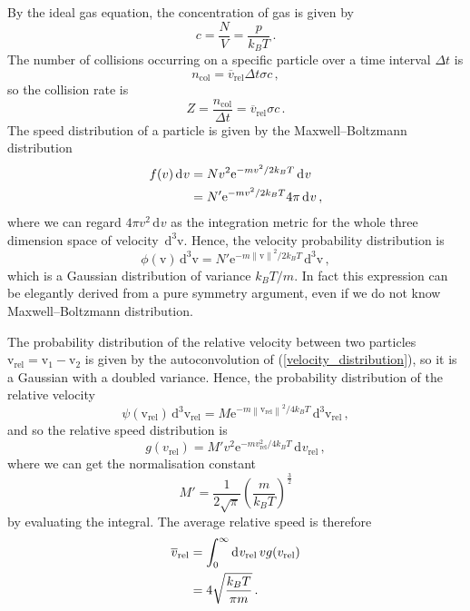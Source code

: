 \documentclass{article}
\theoremstyle{plain}\theoremheaderfont{\normalfont\itshape}\theorembodyfont{\rmfamily}\theoremseparator{.}\newtheorem*{rem}{Remark}\newtheorem*{ex}{Example}\newtheorem*{proof}{Proof}\newtheorem*{altp}{Alternative proof}
\theoremstyle{plain}\theoremheaderfont{\normalfont\bfseries}\theorembodyfont{\rmfamily}\theoremseparator{.}\newtheorem{thm}{Theorem}[section]\newtheorem{lem}[thm]{Lemma}\newtheorem{prop}[thm]{Proposition}\newtheorem*{cor}{Corollary}\newtheorem{defn}[thm]{Definition}\newtheorem{clm}[thm]{Claim}\newtheorem{clminproof}{Claim}\newtheorem{pos}{Postulate}[section]
\theoremstyle{break}\theoremheaderfont{\normalfont\itshape}\theorembodyfont{\rmfamily}\theoremseparator{.\medskip}\newtheorem*{proofskip}{Proof}\newtheorem*{exs}{Examples}\newtheorem*{rems}{Remarks}
\theoremstyle{break}\theoremheaderfont{\normalfont\bfseries}\theorembodyfont{\rmfamily}\theoremseparator{.\medskip}\newtheorem{lemskip}[thm]{Lemma}\newtheorem{defnskip}[thm]{Definition}\newtheorem{propskip}[thm]{Proposition}\newtheorem{thmskip}[thm]{Theorem}
\numberwithin{equation}{section}
\newcommand{\ee}{\mathrm{e}}
\newcommand{\dd}[2][]{\mathrm{d}^{#1} #2\,}
\renewcommand{\d}[2][]{\,\mathrm{d}^{#1} #2}
\newcommand{\vb}[1]{\bm{\mathrm{#1}}}
\newcommand{\norm}[1]{\left\| #1 \right\|}
\begin{document}
    By the ideal gas equation, the concentration of gas is given by
    \begin{equation}\label{ideal_gas_concentration}
        c=\frac{N}{V}=\frac{p}{k_BT}\,.
    \end{equation}
    The number of collisions occurring on a specific particle over a time interval \(\Delta t\) is
    \begin{equation}
        n_{\text{col}}=\overline{v}_{\text{rel}}\Delta t\sigma c\,,
    \end{equation}
    so the collision rate is
    \begin{equation}\label{collision_rate}
        Z=\frac{n_{\text{col}}}{\Delta t}=\overline{v}_{\text{rel}}\sigma c\,.
    \end{equation}
    The speed distribution of a particle is given by the Maxwell--Boltzmann distribution
    \begin{align}
        f(v)\d{v}&=Nv^2 \ee^{-mv^2/2k_BT}\d{v}\notag\\
        &=N'\ee^{-mv^2/2k_BT}4\pi\d{v}\,,
    \end{align}
    where we can regard \(4\pi v^2\d{v}\) as the integration metric for the whole three dimension space of velocity \(\d[3]{\vb{v}}\). Hence, the velocity probability distribution is
    \begin{equation}\label{velocity_distribution}
        \phi(\vb{v})\d[3]{\vb{v}}=N'\ee^{-m\norm{\vb{v}}^2/2k_B T}\d[3]{\vb{v}}\,,
    \end{equation}
    which is a Gaussian distribution of variance \(k_B T/m\). In fact this expression can be elegantly derived from a pure symmetry argument, even if we do not know Maxwell--Boltzmann distribution.

    The probability distribution of the relative velocity between two particles \(\vb{v}_{\text{rel}}=\vb{v}_1-\vb{v}_2\) is given by the autoconvolution of (\ref{velocity_distribution}), so it is a Gaussian with a doubled variance. Hence, the probability distribution of the relative velocity
    \begin{equation}
        \psi(\vb{v}_{\text{rel}})\d[3]{\vb{v}_{\text{rel}}}=M\ee^{-m\norm{\vb{v}_{\text{rel}}}^2/4k_B T}\d[3]{\vb{v}_{\text{rel}}}\,,
    \end{equation}
    and so the relative speed distribution is
    \begin{equation}
        g(v_{\text{rel}})=M'v^2\ee^{-mv_{\text{rel}}^2/4k_B T}\d{v_{\text{rel}}}\,,
    \end{equation}
    where we can get the normalisation constant
    \begin{equation}
        M'=\frac{1}{2\sqrt{\pi}}\left(\frac{m}{k_B T}\right)^{\frac{3}{2}}
    \end{equation}
    by evaluating the integral. The average relative speed is therefore
    \begin{align}
        \overline{v}_{\text{rel}}&=\int_{0}^{\infty}\dd{v_{\text{rel}}}vg(v_{\text{rel}})\notag\\
        &=4\sqrt{\frac{k_B T}{\pi m}}\,.\label{relative_speed}
    \end{align}
\end{document}
